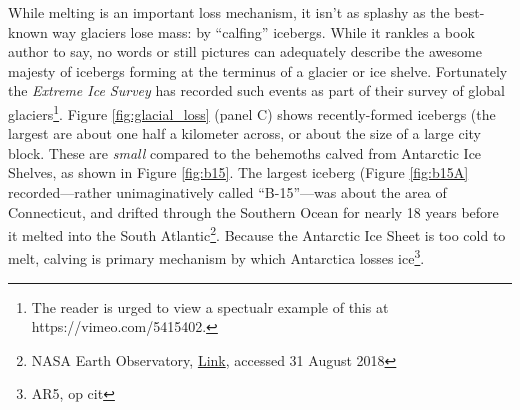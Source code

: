 While melting is an important loss mechanism, it isn't as splashy as the best-known way glaciers lose mass: by ``calfing'' icebergs. While it rankles a book author to say, no words or still pictures can adequately describe the awesome majesty of icebergs forming at the terminus of a glacier or ice shelve. Fortunately the \textit{Extreme Ice Survey} has recorded such events as part of their survey of global glaciers\footnote{The reader is urged to view a spectualr example of this at https://vimeo.com/5415402.}. Figure \ref{fig:glacial_loss} (panel C) shows recently-formed icebergs (the largest are about one half a kilometer across, or about the size of a large city block. These are \emph{small} compared to the behemoths calved from Antarctic Ice Shelves, as shown in Figure \ref{fig:b15}. The largest iceberg (Figure \ref{fig:b15A} recorded---rather unimaginatively called ``B-15''---was about the area of Connecticut, and drifted through the Southern Ocean for nearly 18 years before it melted into the South Atlantic\footnote{NASA Earth Observatory, \href{https://earthobservatory.nasa.gov/images/92238/end-of-the-journey-for-iceberg-b-15z}{Link}, accessed 31 August 2018}. Because the Antarctic Ice Sheet is too cold to melt, calving is primary mechanism by which Antarctica losses ice\footnote{AR5, op cit}. \\

